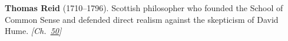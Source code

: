 \textbf{Thomas Reid} (1710–1796). Scottish philosopher who founded the School of Common Sense and defended direct realism against the skepticism of David Hume. \emph{[Ch.~\hyperref[ch:consciousness]{50}]}


